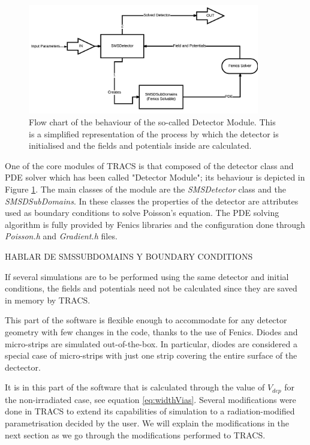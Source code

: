 \begin{figure}[H]
	\centering
	\includegraphics[width=0.9\textwidth]{Detector_Module.png}
	\caption{Flow chart of the behaviour of the so-called Detector Module. This is a simplified representation of the process by which the detector is initialised and the fields and potentials inside are calculated.}
	\label{fig:DetectorFc}
\end{figure}

One of the core modules of TRACS is that composed of the detector class and PDE solver which has been called "Detector Module"; its behaviour is depicted in Figure \ref{fig:DetectorFc}. The main classes of the module are the \textit{SMSDetector} class and the \textit{SMSDSubDomains}. In these classes the properties of the detector are attributes used as boundary conditions to solve Poisson's equation. The PDE solving algorithm is fully provided by Fenics libraries and the configuration done through \textit{Poisson.h} and \textit{Gradient.h} files.

HABLAR DE SMSSUBDOMAINS Y BOUNDARY CONDITIONS

If several simulations are to be performed using the same detector and initial conditions, the fields and potentials need not be calculated since they are saved in memory by TRACS. 

This part of the software is flexible enough to accommodate for any detector geometry with few changes in the code, thanks to the use of Fenics. Diodes and micro-strips are simulated out-of-the-box. In particular, diodes are considered a special case of micro-strips with just one strip covering the entire surface of the dectector.

It is in this part of the software that \neff is calculated through the value of $V_{dep}$ for the non-irradiated case, see equation \ref{eq:widthVias}. Several modifications were done in TRACS to extend its capabilities of simulation to a radiation-modified \neff parametrisation decided by the user. We will explain the modifications in the next section as we go through the modifications performed to TRACS.


